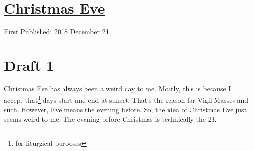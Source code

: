 \documentclass[12pt]{article}[titlepage]
\newcommand{\1}{\={a}}
\newcommand{\2}{\={e}}
\newcommand{\3}{\={\i}}
\newcommand{\4}{\=o}
\newcommand{\5}{\=u}
\newcommand{\6}{\={A}}
\renewcommand{\,}{\textsuperscript{,}}
\begin{document}
\doublespacing
\section{\href{christmas-eve.html}{Christmas Eve}}
First Published: 2018 December 24
\section{Draft 1}
Christmas Eve has always been a weird day to me.
Mostly, this is because I accept that\footnote{for liturgical purposes} days start and end at sunset.
That's the reason for Vigil Masses and such.
However, Eve means \href{https://en.wiktionary.org/w/index.php?title=Special:Search&search=eve}{the evening before.}
So, the idea of Christmas Eve just seems weird to me.
The evening before Christmas is technically the 23.
\end{document}
